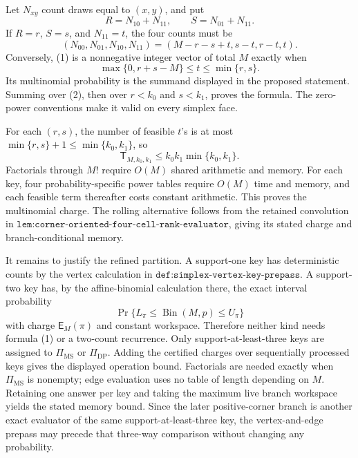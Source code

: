 Let \(N_{xy}\) count draws equal to \((x,y)\), and put
\[
R=N_{10}+N_{11},\qquad S=N_{01}+N_{11}.
\]
If \(R=r\), \(S=s\), and \(N_{11}=t\), the four counts must be
\[
(N_{00},N_{01},N_{10},N_{11})
=(M-r-s+t,s-t,r-t,t).
\tag{1}
\]
Conversely, (1) is a nonnegative integer vector of total \(M\) exactly when
\[
\max\{0,r+s-M\}\le t\le\min\{r,s\}.
\tag{2}
\]
Its multinomial probability is the summand displayed in the proposed statement. Summing over (2), then over \(r<k_0\) and \(s<k_1\), proves the formula. The zero-power conventions make it valid on every simplex face.

For each \((r,s)\), the number of feasible \(t\)'s is at most \(\min\{r,s\}+1\le\min\{k_0,k_1\}\), so
\[
\mathsf T_{M,k_0,k_1}\le k_0k_1\min\{k_0,k_1\}.
\tag{3}
\]
Factorials through \(M!\) require \(O(M)\) shared arithmetic and memory. For each key, four probability-specific power tables require \(O(M)\) time and memory, and each feasible term thereafter costs constant arithmetic. This proves the multinomial charge. The rolling alternative follows from the retained convolution in \(\texttt{lem:corner-oriented-four-cell-rank-evaluator}\), giving its stated charge and branch-conditional memory.

It remains to justify the refined partition. A support-one key has deterministic counts by the vertex calculation in \(\texttt{def:simplex-vertex-key-prepass}\). A support-two key has, by the affine-binomial calculation there, the exact interval probability
\[
\Pr\{L_\pi\le\operatorname{Bin}(M,p)\le U_\pi\}
\]
with charge \(\mathsf E_M(\pi)\) and constant workspace. Therefore neither kind needs formula (1) or a two-count recurrence. Only support-at-least-three keys are assigned to \(\Pi_{\mathrm{MS}}\) or \(\Pi_{\mathrm{DP}}\). Adding the certified charges over sequentially processed keys gives the displayed operation bound. Factorials are needed exactly when \(\Pi_{\mathrm{MS}}\) is nonempty; edge evaluation uses no table of length depending on \(M\). Retaining one answer per key and taking the maximum live branch workspace yields the stated memory bound. Since the later positive-corner branch is another exact evaluator of the same support-at-least-three key, the vertex-and-edge prepass may precede that three-way comparison without changing any probability.